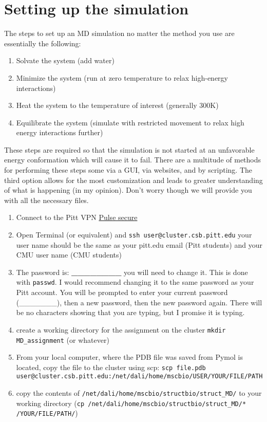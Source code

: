 \documentclass[11pt]{article}
\begin{document}
\section*{Setting up the simulation}

The steps to set up an MD simulation no matter the method you use are essentially the following:
\begin{enumerate}
    \item Solvate the system (add water)
    \item Minimize the system (run at zero temperature to relax high-energy interactions)
    \item Heat the system to the temperature of interest (generally 300K)
    \item Equilibrate the system (simulate with restricted movement to relax high energy interactions further) 
\end{enumerate}

These steps are required so that the simulation is not started at an unfavorable energy conformation which will cause it to fail. There are a multitude of methods for performing these steps some via a GUI, via websites, and by scripting. The third option allows for the most customization and leads to greater understanding of what is happening (in my opinion). Don't worry though we will provide you with all the necessary files.   

\begin{enumerate}
    \item Connect to the Pitt VPN \href{https://www.technology.pitt.edu/services/pittnet-vpn-pulse-secure}{Pulse secure} 
    \item Open Terminal (or equivalent) and \texttt{ssh user@cluster.csb.pitt.edu} your user name should be the same as your pitt.edu email (Pitt students) and your CMU user name (CMU students) 
    \item The password is: \textbf{________} you will need to change it. This is done with \texttt{passwd}. I would recommend changing it to the same password as your Pitt account. You will be prompted to enter your current password (_______), then a new password, then the new password again. There will be no characters showing that you are typing, but I promise it is typing.
    \item create a working directory for the assignment on the cluster \texttt{mkdir MD\_assignment} (or whatever)
    \item From your local computer, where the PDB file was saved from Pymol is located, copy the file to the cluster using scp:
    \subitem \texttt{scp file.pdb user@cluster.csb.pitt.edu:/net/dali/home/mscbio/USER/YOUR/FILE/PATH}
    \item copy the contents of \texttt{/net/dali/home/mscbio/structbio/struct\_MD/} to your working directory (\texttt{cp /net/dali/home/mscbio/structbio/struct\_MD/* /YOUR/FILE/PATH/}) 
\end{enumerate}
\end{document}
